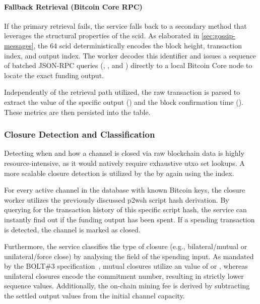 \paragraph{Fallback Retrieval (Bitcoin Core RPC)}
If the primary retrieval fails, the service falls back to a secondary method that leverages the structural properties of the \gls{scid}. 
As elaborated in \autoref{sec:gossip-messages}, the \qty{64}{\bit} \gls{scid} deterministically encodes the block height, transaction index, and output index. 
The worker decodes this identifier and issues a sequence of batched JSON-RPC queries (, , and ) 
directly to a local Bitcoin Core node to locate the exact funding output.

Independently of the retrieval path utilized, the raw transaction is parsed to extract the value of the 
specific output () and the block confirmation time (). 
These metrics are then persisted into the  table.

\subsubsection{Closure Detection and Classification}
Detecting when and how a channel is closed via raw blockchain data is highly resource-intensive, 
as it would natively require exhaustive \gls{utxo} set lookups. 
A more scalable closure detection is utilized by the  by again using the  index.

For every active channel in the database with known Bitcoin keys, the closure worker utilizes the previously discussed \gls{p2wsh} script hash derivation. 
By querying  for the transaction history of this specific script hash, 
the service can instantly find out if the funding output has been spent. 
If a spending transaction is detected, the channel is marked as closed.

Furthermore, the service classifies the type of closure (e.g., bilateral/mutual or unilateral/force close) 
by analysing the  field of the spending input. 
As mandated by the BOLT\#3 specification~\cite{lightningdevelopers_bolt-3_2026}, 
mutual closures utilize an  value of  or , 
whereas unilateral closures encode the commitment number, resulting in strictly lower sequence values. 
Additionally, the on-chain mining fee is derived by subtracting the settled output values from the initial channel capacity.

